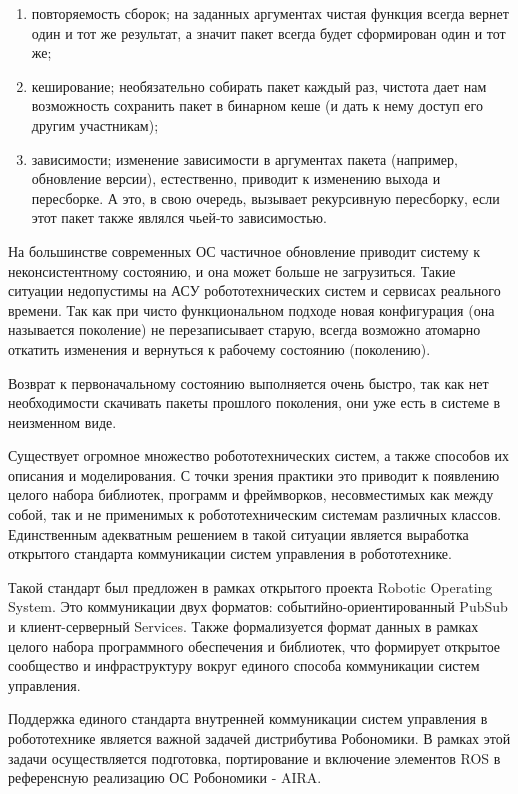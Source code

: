 \documentclass{article}
\begin{document}
\begin{enumerate}
\item повторяемость сборок; на заданных аргументах чистая функция всегда вернет один и тот же результат, а значит пакет всегда будет сформирован один и тот же;
\item кеширование; необязательно собирать пакет каждый раз, чистота дает нам возможность сохранить пакет в бинарном кеше (и дать к нему доступ его другим участникам);
\item зависимости; изменение зависимости в аргументах пакета (например, обновление версии), естественно, приводит к изменению выхода и пересборке. А это, в свою очередь, вызывает рекурсивную пересборку, если этот пакет также являлся чьей-то зависимостью.
\end{enumerate}

На большинстве современных ОС частичное обновление приводит систему к неконсистентному состоянию, и она может больше не загрузиться. Такие ситуации недопустимы на АСУ робототехнических систем и сервисах реального времени. Так как при чисто функциональном подходе новая конфигурация (она называется поколение) не перезаписывает старую, всегда возможно атомарно откатить изменения и вернуться к рабочему состоянию (поколению).


Возврат к первоначальному состоянию выполняется очень быстро, так как нет необходимости скачивать пакеты прошлого поколения, они уже есть в системе в неизменном виде.



Существует огромное множество робототехнических систем, а также способов их описания и моделирования. С точки зрения практики это приводит к появлению целого набора библиотек, программ и фреймворков, несовместимых как между собой, так и не применимых к робототехническим системам различных классов. Единственным адекватным решением в такой ситуации является выработка открытого стандарта коммуникации систем управления в робототехнике.

Такой стандарт был предложен в рамках открытого проекта Robotic Operating System. Это коммуникации двух форматов: событийно-ориентированный PubSub и клиент-серверный Services. Также формализуется формат данных в рамках целого набора программного обеспечения и библиотек, что формирует открытое сообщество и инфраструктуру вокруг единого способа коммуникации систем управления.

Поддержка единого стандарта внутренней коммуникации систем управления в робототехнике является важной задачей дистрибутива Робономики. В рамках этой задачи осуществляется подготовка, портирование и включение элементов ROS в референсную реализацию ОС Робономики - AIRA.
\end{document}
